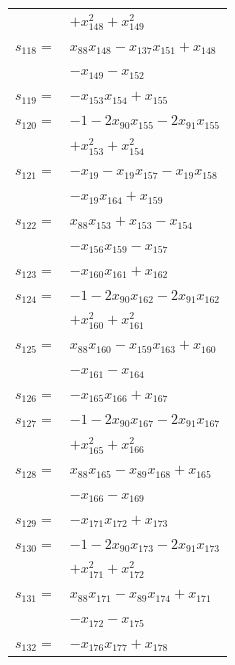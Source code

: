 \begin{longtable}{@{}r@{\;}l@{}}
 & \(\displaystyle +x_{148}^{2} +x_{149}^{2}\) \\[3pt]
\(s_{118}=\) & \(\displaystyle x_{88}x_{148} -x_{137}x_{151} +x_{148}\) \\
 & \(\displaystyle -x_{149} -x_{152}\) \\[3pt]
\(s_{119}=\) & \(\displaystyle -x_{153}x_{154} +x_{155}\) \\[3pt]
\(s_{120}=\) & \(\displaystyle -1 -2x_{90}x_{155} -2x_{91}x_{155}\) \\
 & \(\displaystyle +x_{153}^{2} +x_{154}^{2}\) \\[3pt]
\(s_{121}=\) & \(\displaystyle -x_{19} -x_{19}x_{157} -x_{19}x_{158}\) \\
 & \(\displaystyle -x_{19}x_{164} +x_{159}\) \\[3pt]
\(s_{122}=\) & \(\displaystyle x_{88}x_{153} +x_{153} -x_{154}\) \\
 & \(\displaystyle -x_{156}x_{159} -x_{157}\) \\[3pt]
\(s_{123}=\) & \(\displaystyle -x_{160}x_{161} +x_{162}\) \\[3pt]
\(s_{124}=\) & \(\displaystyle -1 -2x_{90}x_{162} -2x_{91}x_{162}\) \\
 & \(\displaystyle +x_{160}^{2} +x_{161}^{2}\) \\[3pt]
\(s_{125}=\) & \(\displaystyle x_{88}x_{160} -x_{159}x_{163} +x_{160}\) \\
 & \(\displaystyle -x_{161} -x_{164}\) \\[3pt]
\(s_{126}=\) & \(\displaystyle -x_{165}x_{166} +x_{167}\) \\[3pt]
\(s_{127}=\) & \(\displaystyle -1 -2x_{90}x_{167} -2x_{91}x_{167}\) \\
 & \(\displaystyle +x_{165}^{2} +x_{166}^{2}\) \\[3pt]
\(s_{128}=\) & \(\displaystyle x_{88}x_{165} -x_{89}x_{168} +x_{165}\) \\
 & \(\displaystyle -x_{166} -x_{169}\) \\[3pt]
\(s_{129}=\) & \(\displaystyle -x_{171}x_{172} +x_{173}\) \\[3pt]
\(s_{130}=\) & \(\displaystyle -1 -2x_{90}x_{173} -2x_{91}x_{173}\) \\
 & \(\displaystyle +x_{171}^{2} +x_{172}^{2}\) \\[3pt]
\(s_{131}=\) & \(\displaystyle x_{88}x_{171} -x_{89}x_{174} +x_{171}\) \\
 & \(\displaystyle -x_{172} -x_{175}\) \\[3pt]
\(s_{132}=\) & \(\displaystyle -x_{176}x_{177} +x_{178}\) \\[3pt]

\end{longtable}
